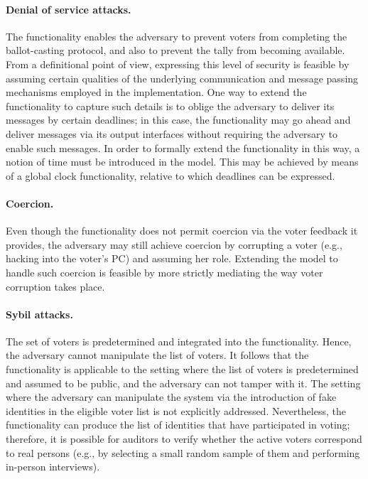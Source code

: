 \paragraph{Denial of service attacks.} The functionality enables the
adversary to prevent voters from completing the ballot-casting
protocol, and also to prevent the tally from becoming available. From
a definitional point of view, expressing this level of security is
feasible by assuming certain qualities of the underlying communication
and message passing mechanisms employed in the implementation. One way
to extend the functionality to capture such details is to oblige the
adversary to deliver its messages by certain deadlines; in this case,
the functionality may go ahead and deliver messages via its output
interfaces without requiring the adversary to enable such messages. In
order to formally extend the functionality in this way, a notion of
time must be introduced in the model. This may be achieved by means of
a global clock functionality, relative to which deadlines can be
expressed.

\paragraph{Coercion.} Even though the functionality does not permit
coercion via the voter feedback it provides, the adversary may still
achieve coercion by corrupting a voter (e.g., hacking into the voter's
PC) and assuming her role. Extending the model to handle such coercion
is feasible by more strictly mediating the way voter corruption takes
place.

\paragraph{Sybil attacks.} The set of voters is predetermined and
integrated into the functionality. Hence, the adversary cannot
manipulate the list of voters. It follows that the functionality is
applicable to the setting where the list of voters is predetermined
and assumed to be public, and the adversary can not tamper with it.
The setting where the adversary can manipulate the system via the
introduction of fake identities in the eligible voter list is not
explicitly addressed. Nevertheless, the functionality can produce the
list of identities that have participated in voting; therefore, it is
possible for auditors to verify whether the active voters correspond
to real persons (e.g., by selecting a small random sample of them and
performing in-person interviews).

